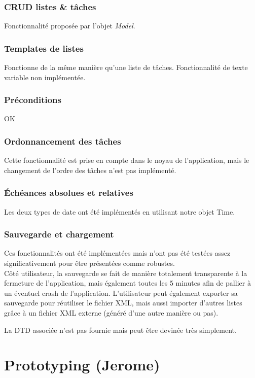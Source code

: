 		\subsection{CRUD listes \& tâches}
			Fonctionnalité proposée par l'objet \emph{Model}.
			
		\subsection{Templates de listes}
			Fonctionne de la même manière qu'une liste de tâches. Fonctionnalité de texte variable non implémentée.
		
		\subsection{Préconditions}
			OK
			
		\subsection{Ordonnancement des tâches}
			Cette fonctionnalité est prise en compte dans le noyau de l'application, mais le changement de l'ordre des tâches n'est pas implémenté.
			
		\subsection{Échéances absolues et relatives}
			Les deux types de date ont été implémentés en utilisant notre objet Time.
		
		\subsection{Sauvegarde et chargement}
			Ces fonctionnalités ont été implémentées mais n'ont pas été testées assez significativement pour être présentées comme robustes.\\
			
			Côté utilisateur, la sauvegarde se fait de manière totalement transparente à la fermeture de l'application, mais également toutes les 5 minutes afin de pallier à un éventuel crash de l'application. L'utilisateur peut également exporter sa sauvegarde pour réutiliser le fichier XML, mais aussi importer d'autres listes grâce à un fichier XML externe (généré d'une autre manière ou pas).
			
			La DTD associée n'est pas fournie mais peut être devinée très simplement.


\chapter{Prototyping (Jerome)}

